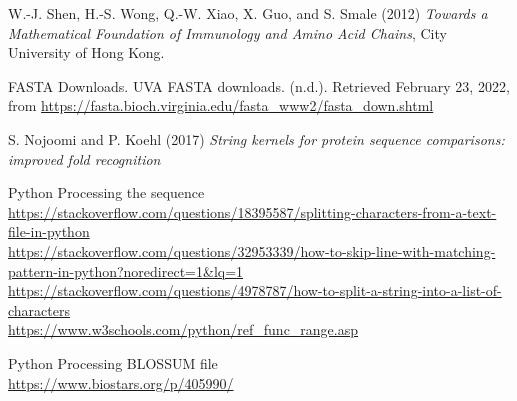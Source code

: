 \documentclass{article}
\begin{document}
\begin{thebibliography}{9}
W.-J. Shen, H.-S. Wong, Q.-W. Xiao, X. Guo, and S. Smale (2012) \emph{Towards a Mathematical Foundation of
Immunology and Amino Acid Chains}, City University of Hong Kong.

FASTA Downloads. UVA FASTA downloads. (n.d.). Retrieved February 23, 2022, from \url{https://fasta.bioch.virginia.edu/fasta_www2/fasta_down.shtml}

S. Nojoomi and P. Koehl (2017) \emph{String kernels for protein sequence
comparisons: improved fold recognition}

Python Processing the sequence
\\
\url{https://stackoverflow.com/questions/18395587/splitting-characters-from-a-text-file-in-python} \\
\url{https://stackoverflow.com/questions/32953339/how-to-skip-line-with-matching-pattern-in-python?noredirect=1&lq=1} \\
\url{https://stackoverflow.com/questions/4978787/how-to-split-a-string-into-a-list-of-characters} \\
\url{https://www.w3schools.com/python/ref_func_range.asp}

Python Processing BLOSSUM file \\
\url{https://www.biostars.org/p/405990/}
\end{thebibliography}
\end{document}

